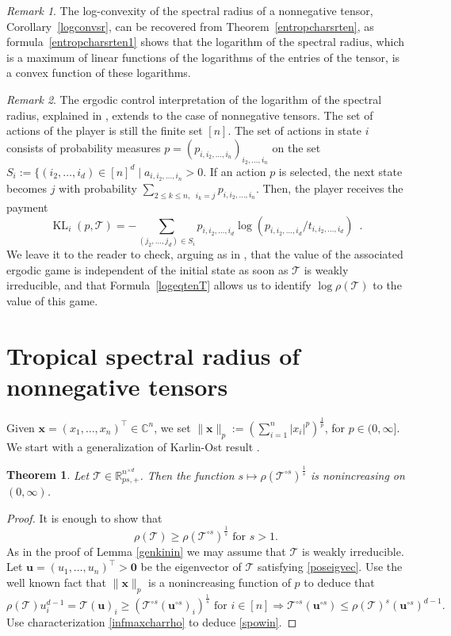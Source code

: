 \documentclass{amsart}
\newcommand{\C}{\mathbb{C}}
\newcommand{\R}{\mathbb{R}}
\newcommand{\uu}{\mathbf{u}}
\newcommand{\x}{\mathbf{x}}
\newcommand{\0}{\mathbf{0}}
\newcommand{\1}{\mathbf{1}}
\newcommand{\cT}{\mathcal{T}}
\newcommand{\trans}{^\top}
\newtheorem{theorem}[theo]{Theorem}
\theoremstyle{remark}
\newtheorem{rem}{Remark}
\numberwithin{equation}{section} %
\renewcommand{\leq}{\leqslant}
\renewcommand{\ge}{\geqslant}
\renewcommand{\le}{\leqslant}
\begin{document}
\begin{rem}
%
%
The log-convexity of the spectral radius of a nonnegative tensor, Corollary~\ref{logconvsr}, can be recovered from Theorem~\ref{entropcharsrten}, as formula~\eqref{entropcharsrten1} shows that the logarithm of the spectral radius, which is a maximum of linear functions of the logarithms of the entries of the tensor, 
is a convex function of these logarithms.
\end{rem}
%
\begin{rem}\label{rem-ergodiccontrol}
%
The ergodic control interpretation of the logarithm of the spectral radius, explained in , extends to the case of nonnegative tensors.
The set of actions of the player is still the finite set $[n]$. 
The set of actions in state $i$ consists of probability
measures $p=(p_{i,i_2,\dots,i_n})_{i_2,\dots,i_n}$ on the set $S_i:= \{(i_2,\dots,i_d)\in [n]^d\mid a_{i,i_2,\dots,i_n}>0$. If an action $p$ is selected, the next
state becomes $j$ with probability $\sum_{2\leq k\leq n,\;\; i_k = j} p_{i,i_2,\dots,i_n}$. Then, the player receives the payment 
\[
\operatorname{KL}_i(p,\cT)= -\sum_{(j_2,\dots,j_d)\in S_i} p_{i,i_2,\dots,i_d}\log(p_{i,i_2,\dots,i_d}/t_{i,i_2,\dots,i_d}) \enspace.
\]
We leave it to the reader to check, arguing as in , that 
the value of the associated ergodic game is independent of the initial
state as soon as $\cT$ is weakly irreducible, and that Formula~\eqref{logeqtenT}
allows us to identify $\log \rho(\cT)$ to the value of this game.
\end{rem}

 \section{Tropical spectral radius of nonnegative tensors}\label{sec:tropspecread}
Given $\x=(x_1,\ldots,x_n)\trans \in \C^{n}$, 
we set $\|\x\|_p:=(\sum_{i=1}^n |x_i|^p)^{\frac{1}{p}}$,
%
%
for $p\in (0,\infty]$.
%
 We start with a generalization of Karlin-Ost result \cite{KO85}.
 \begin{theorem}\label{genKO}  Let $\cT\in\R_{ps,+}^{n^{\times d}}$.  Then the function $s\mapsto \rho(\cT^{\circ s})^{\frac{1}{s}}$ is nonincreasing on $(0,\infty)$.
 \end{theorem}
 \begin{proof}  It is enough to show that
 \begin{equation}\label{spowin}
 \rho(\cT)\ge \rho(\cT^{\circ s})^{\frac{1}{s}} \textrm{ for } s>1.
 \end{equation}
  As in the proof of Lemma \ref{genkinin} we may assume
 that $\cT$ is weakly irreducible.  Let $\uu=(u_1,\ldots,u_n)\trans>\0$ be the eigenvector of $\cT$ satisfying \eqref{poseigvec}.
 Use the well known fact that $\|\x\|_p$ is a nonincreasing function of $p$ to deduce that
 \[\rho(\cT)u_i^{d-1}=\cT(\uu)_i\ge (\cT^{\circ s}(\uu^{\circ s})_i)^{\frac{1}{s}} \textrm{ for }  i\in [n] \Rightarrow \cT^{\circ s}(\uu^{\circ s})\le
  \rho(\cT)^s (\uu^{\circ s})^{d-1}.\]
 Use characterization \eqref{infmaxcharrho} to deduce \eqref{spowin}. \end{proof}
\end{document}
